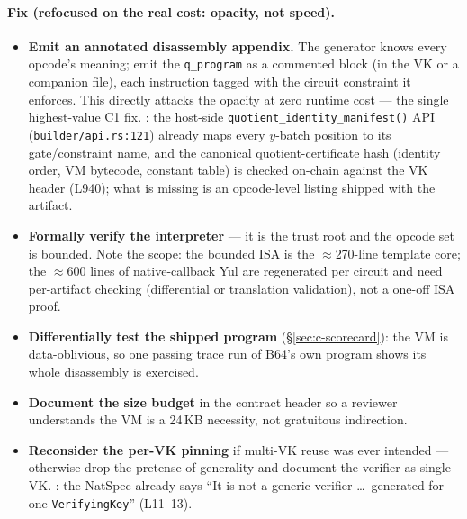 \paragraph{Fix (refocused on the real cost: opacity, not speed).}
\begin{itemize}[leftmargin=1.4em,itemsep=2pt]
\item \textbf{Emit an annotated disassembly appendix.} The
  generator knows every opcode's meaning; emit the
  \texttt{q\_program} as a commented block (in the VK or a
  companion file), each instruction tagged with the circuit
  constraint it enforces. This directly attacks the opacity at
  zero runtime cost --- the single highest-value C1 fix.
  : the host-side
  \texttt{quotient\_\allowbreak{}identity\_\allowbreak{}manifest()} API
  (\texttt{builder/\allowbreak{}api.rs:121}) already maps every $y$-batch
  position to its gate/constraint name, and the canonical
  quotient-certificate hash (identity order, VM bytecode, constant
  table) is checked on-chain against the VK header (L940); what is
  missing is an opcode-level listing shipped with the artifact.
\item \textbf{Formally verify the interpreter} --- it is the trust
  root and the opcode set is bounded. Note the scope: the bounded
  ISA is the $\approx$270-line template core; the $\approx$600
  lines of native-callback Yul are regenerated per circuit and need
  per-artifact checking (differential or translation validation),
  not a one-off ISA proof. 
\item \textbf{Differentially test the shipped program}
  (\S\ref{sec:c-scorecard}): the VM is data-oblivious, so one passing
  trace run of B64's own program shows its whole
  disassembly is exercised. 
\item \textbf{Document the size budget} in the contract header so
  a reviewer understands the VM is a 24\,KB necessity, not
  gratuitous indirection. 
\item \textbf{Reconsider the per-VK pinning} if multi-VK reuse
  was ever intended --- otherwise drop the pretense of generality
  and document the verifier as single-VK. : the
  NatSpec already says ``It is not a generic verifier \ldots\
  generated for one \texttt{VerifyingKey}'' (L11--13).
\end{itemize}

